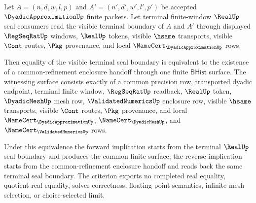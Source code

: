 \begin{theorem}
\label{thm:dyadicapproximation-terminal-seal-common-refinement-pullback}
Let $A=(n,d,w,l,p)$ and $A'=(n',d',w',l',p')$ be accepted
$\DyadicApproximationUp$ finite packets. Let terminal finite-window
$\RealUp$ seal consumers read the visible terminal boundary of $A$ and $A'$
through displayed $\RegSeqRatUp$ windows, $\RealUp$ tokens, visible $\hsame$
transports, visible $\Cont$ routes, $\Pkg$ provenance, and local
$\NameCert_{\DyadicApproximationUp}$ rows.

Then equality of the visible terminal seal boundary is equivalent to the
existence of a common-refinement enclosure handoff through one finite
$\mathsf{BHist}$ surface. The witnessing surface consists exactly of a common
precision row, transported dyadic endpoint, terminal finite window,
$\RegSeqRatUp$ readback, $\RealUp$ token, $\DyadicMeshUp$ mesh row,
$\ValidatedNumericsUp$ enclosure row, visible $\hsame$ transports, visible
$\Cont$ routes, $\Pkg$ provenance, and local
$\NameCert_{\DyadicApproximationUp}$, $\NameCert_{\DyadicMeshUp}$, and
$\NameCert_{\ValidatedNumericsUp}$ rows.

Under this equivalence the forward implication starts from the terminal
$\RealUp$ seal boundary and produces the common finite surface; the reverse
implication starts from the common-refinement enclosure handoff and reads back
the same terminal seal boundary. The criterion exports no completed real
equality, quotient-real equality, solver correctness, floating-point
semantics, infinite mesh selection, or choice-selected limit.
\end{theorem}
